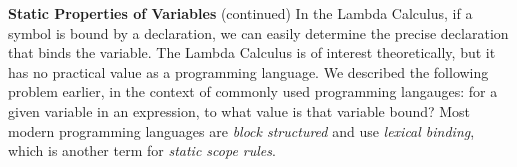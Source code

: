 \begin{minipage}[t]{\sw}
\slidenumber
\LARGE
{\bf Static Properties of Variables} (continued)\exx
In the Lambda Calculus,
if a symbol is bound by a declaration,
we can easily determine the precise declaration that binds the variable.
The Lambda Calculus is of interest theoretically,
but it has no practical value as a programming language.\exx
We described the following problem earlier,
in the context of commonly used programming langauges:
for a given variable in an expression,
to what value is that variable bound?
Most modern programming languages are {\em block structured}
and use {\em lexical binding},
which is another term for {\em static scope rules}.\exx
\end{minipage}
\clearpage
